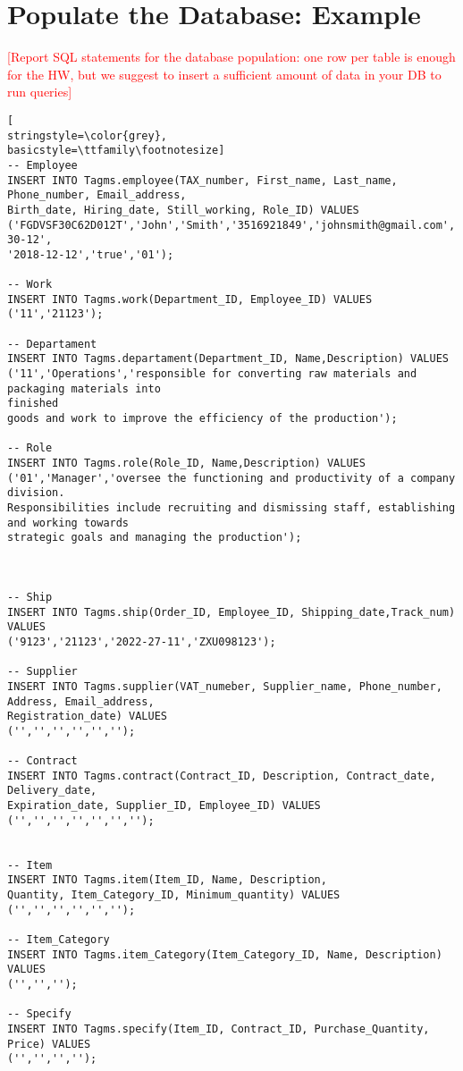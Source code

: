 
\section{Populate the Database: Example}
\textcolor{red}{[Report SQL statements for the database population: one row per table is enough for the HW, but we suggest to insert a sufficient amount of data in your DB to run queries]}


\begin{lstlisting}[
stringstyle=\color{grey},
basicstyle=\ttfamily\footnotesize]
-- Employee
INSERT INTO Tagms.employee(TAX_number, First_name, Last_name, Phone_number, Email_address,
Birth_date, Hiring_date, Still_working, Role_ID) VALUES
('FGDVSF30C62D012T','John','Smith','3516921849','johnsmith@gmail.com','1995-30-12',
'2018-12-12','true','01');

-- Work
INSERT INTO Tagms.work(Department_ID, Employee_ID) VALUES 
('11','21123');

-- Departament
INSERT INTO Tagms.departament(Department_ID, Name,Description) VALUES
('11','Operations','responsible for converting raw materials and packaging materials into 
finished
goods and work to improve the efficiency of the production');

-- Role
INSERT INTO Tagms.role(Role_ID, Name,Description) VALUES 
('01','Manager','oversee the functioning and productivity of a company division.
Responsibilities include recruiting and dismissing staff, establishing and working towards 
strategic goals and managing the production');



-- Ship
INSERT INTO Tagms.ship(Order_ID, Employee_ID, Shipping_date,Track_num) VALUES 
('9123','21123','2022-27-11','ZXU098123');

-- Supplier
INSERT INTO Tagms.supplier(VAT_numeber, Supplier_name, Phone_number, Address, Email_address,
Registration_date) VALUES
('','','','','','');

-- Contract
INSERT INTO Tagms.contract(Contract_ID, Description, Contract_date, Delivery_date,
Expiration_date, Supplier_ID, Employee_ID) VALUES 
('','','','','','','');


-- Item
INSERT INTO Tagms.item(Item_ID, Name, Description,
Quantity, Item_Category_ID, Minimum_quantity) VALUES 
('','','','','','');

-- Item_Category
INSERT INTO Tagms.item_Category(Item_Category_ID, Name, Description) VALUES
('','','');

-- Specify
INSERT INTO Tagms.specify(Item_ID, Contract_ID, Purchase_Quantity, Price) VALUES
('','','','');



\end{lstlisting}
